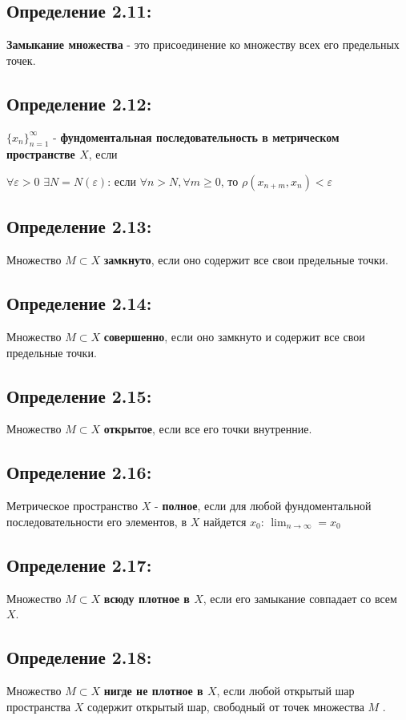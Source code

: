 \documentclass[12pt, english]{article}
\begin{document}
\subsection*{Определение 2.11:}
	 \textbf{Замыкание множества} - это присоединение ко множеству всех его предельных точек.

\subsection*{Определение 2.12:}
	 $\{{x_n}\}_{n = 1}^{\infty}$ - \textbf{фундоментальная последовательность в метрическом пространстве $X$}, если
	 
	 $\forall \varepsilon > 0$ $ \exists N = N(\varepsilon)$: 
	 если $\forall n > N, \forall m \ge 0$, то 
	 $\rho(x_{n+m}, x_n) < \varepsilon$
	 
\subsection*{Определение 2.13:}
	 Множество $M \subset X$ \textbf{замкнуто}, если оно содержит все свои предельные точки.

\subsection*{Определение 2.14:}
	 Множество $M \subset X$\textbf{ совершенно}, если оно замкнуто и содержит все свои предельные точки.
	 
\subsection*{Определение 2.15:}
	 Множество $M \subset X$ \textbf{открытое}, если все его точки внутренние.
	 
\subsection*{Определение 2.16:}
	 Метрическое пространство $X$ - \textbf{полное}, если для любой фундоментальной последовательности его элементов, 
	 в $X$ найдется $x_0$: $\lim_{n \to \infty} = x_0$

\subsection*{Определение 2.17:}
 Множество $M \subset X$ \textbf{всюду плотное в $X$}, если его замыкание совпадает со всем $X$.
 
\subsection*{Определение 2.18:}
 Множество $M \subset X$ \textbf{нигде не  плотное в $X$}, если любой открытый шар пространства $X$
содержит открытый шар, свободный от точек множества $M$ .
	 	
\end{document}
